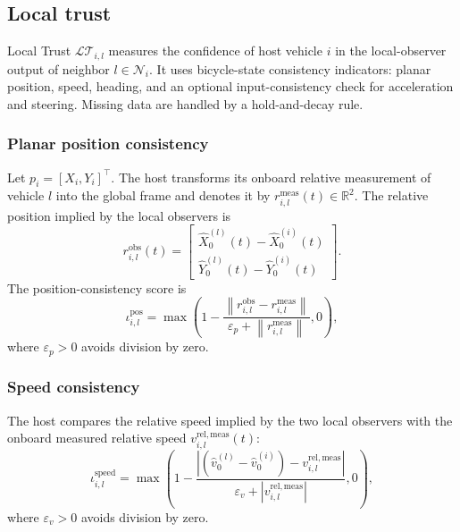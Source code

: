 \documentclass[journal,twoside]{IEEEtran}
\def\N{\mathcal{N}} %
\def\LT{\mathcal{LT}} %
\begin{document}
\subsection{Local trust}\label{sub:local_trust}

Local Trust $\LT_{i,l}$ measures the confidence of host vehicle $i$ in the local-observer output of neighbor $l \in \N_i$.
It uses bicycle-state consistency indicators: planar position, speed, heading, and an optional input-consistency check for acceleration and steering. Missing data are handled by a hold-and-decay rule.

\subsubsection{Planar position consistency}
Let $p_i=[X_i,Y_i]^\top$. The host transforms its onboard relative measurement of vehicle $l$ into the global frame and denotes it by $r_{i,l}^{\mathrm{meas}}(t)\in\mathbb{R}^2$. The relative position implied by the local observers is
\begin{equation*}
    r_{i,l}^{\mathrm{obs}}(t)=
    \begin{bmatrix}\hat X_0^{(l)}(t)-\hat X_0^{(i)}(t)\\
    \hat Y_0^{(l)}(t)-\hat Y_0^{(i)}(t)
    \end{bmatrix}.
\end{equation*}
The position-consistency score is
\begin{equation*}
    \iota_{i,l}^{\text{pos}}
    =
    \max\left(
    1 -
    \frac{\left\|r_{i,l}^{\mathrm{obs}}-r_{i,l}^{\mathrm{meas}}\right\|}
    {\varepsilon_p+\left\|r_{i,l}^{\mathrm{meas}}\right\|},
    0
    \right),
\end{equation*}
where $\varepsilon_p>0$ avoids division by zero.

\subsubsection{Speed consistency}
The host compares the relative speed implied by the two local observers with the onboard measured relative speed $v_{i,l}^{\mathrm{rel,meas}}(t)$:
\begin{equation*}
    \iota_{i,l}^{\text{speed}}
    =
    \max\left(
    1 -
    \frac{\left|(\hat{v}_{0}^{(l)}-\hat{v}_{0}^{(i)})-v_{i,l}^{\mathrm{rel,meas}}\right|}
    {\varepsilon_v+\left|v_{i,l}^{\mathrm{rel,meas}}\right|},
    0
    \right),
\end{equation*}
where $\varepsilon_v>0$ avoids division by zero.
\end{document}
